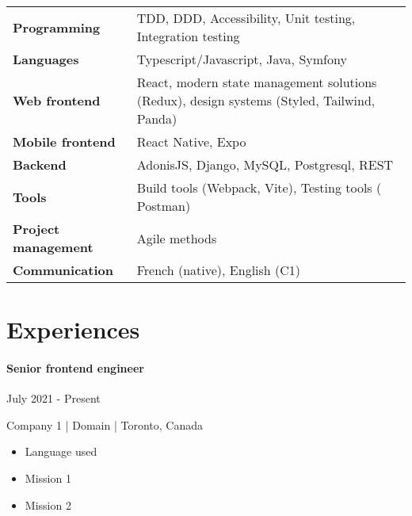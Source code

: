 \documentclass{article}
\begin{document}
\begin{tabularx}{\textwidth}{@{}lX@{}}

  \textbf{Programming} & TDD, DDD, Accessibility, Unit testing, Integration testing  \\
  \addlinespace[5pt] %

  \textbf{Languages} & Typescript/Javascript, Java, Symfony \\
  \addlinespace[5pt] %

  \textbf{Web frontend} & React, modern state management solutions (Redux), design systems (Styled, Tailwind, Panda) \\
  \addlinespace[5pt] %

  \textbf{Mobile frontend} & React Native, Expo \\
  \addlinespace[5pt] %

  \textbf{Backend} & AdonisJS, Django, MySQL, Postgresql, REST \\
  \addlinespace[5pt] %

  \textbf{Tools} & Build tools (Webpack, Vite), Testing tools ( Postman) \\
  \addlinespace[5pt] %

  \textbf{Project management} & Agile methods \\
  \addlinespace[5pt] %

  \textbf{Communication} & French (native), English (C1)  
\end{tabularx}

\vspace{4ex}
\hrulefill
\section*{Experiences}

\paragraph{Senior frontend engineer}\hspace*{\fill}July 2021 - Present

\noindent
Company 1 | Domain | Toronto, Canada

\raggedright  
\begin{itemize}
  \item{Language used}
  \item{Mission 1}
  \item{Mission 2}
\end{itemize}
\end{document}
